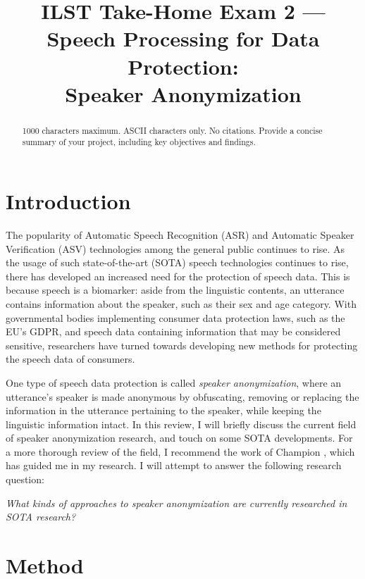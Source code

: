\documentclass{Interspeech2024}
\title{ILST Take-Home Exam 2 --- \\Speech Processing for Data Protection: \\Speaker Anonymization}
\begin{document}
\maketitle


\begin{abstract}   
    1000 characters maximum. ASCII characters only. No citations. Provide a concise summary of your project, including key objectives and findings. 
\end{abstract}



\section{Introduction}
The popularity of Automatic Speech Recognition (ASR) and Automatic Speaker Verification (ASV) technologies among the general public continues to rise.
As the usage of such state-of-the-art (SOTA) speech technologies continues to rise, there has developed an increased need for the protection of speech data.
This is because speech is a biomarker: aside from the linguistic contents, an utterance contains information about the speaker, such as their sex and age category.
With governmental bodies implementing consumer data protection laws, such as the EU's GDPR, and speech data containing information that may be considered sensitive, researchers have turned towards developing new methods for protecting the speech data of consumers.

One type of speech data protection is called \textit{speaker anonymization}, where an utterance's speaker is made anonymous by obfuscating, removing or replacing the information in the utterance pertaining to the speaker, while keeping the linguistic information intact.
In this review, I will briefly discuss the current field of speaker anonymization research, and touch on some SOTA developments.
For a more thorough review of the field, I recommend the work of Champion \cite{champion_2023_thesis}, which has guided me in my research.
I will attempt to answer the following research question:
\begin{displayquote}
    \textit{What kinds of approaches to speaker anonymization are currently researched in SOTA research?}
\end{displayquote}

\section{Method}
\end{document}
